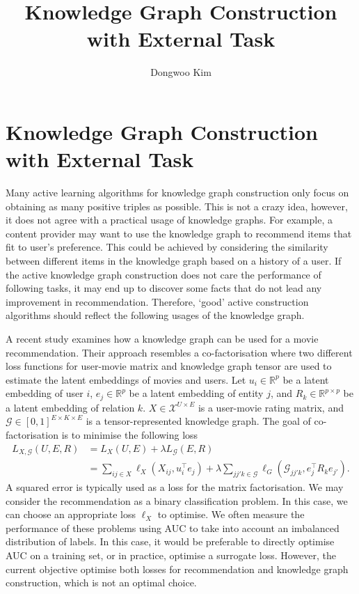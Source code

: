 \documentclass{article} %
\title{Knowledge Graph Construction with External Task }
\author{
Dongwoo Kim
}
\theoremstyle{definition}
\begin{document}
\maketitle


\section{Knowledge Graph Construction with External Task}

Many active learning algorithms for knowledge graph construction only focus on obtaining as many positive triples as possible. This is not a crazy idea, however, it does not agree with a practical usage of knowledge graphs. For example, a content provider may want to use the knowledge graph to recommend items that fit to user's preference. This could be achieved by considering the similarity between different items in the knowledge graph based on a history of a user. If the active knowledge graph construction does not care the performance of following tasks, it may end up to discover some facts that do not lead any improvement in recommendation. Therefore, `good' active construction algorithms should reflect the following usages of the knowledge graph.

A recent study \cite{Zhang2016} examines how a knowledge graph can be used for a movie recommendation. Their approach resembles a co-factorisation where two different loss functions for user-movie matrix and knowledge graph tensor are used to estimate the latent embeddings of movies and users.
Let $u_i \in \mathbb{R}^p$ be a latent embedding of user $i$, $e_j \in \mathbb{R}^p$ be a latent embedding of entity $j$, and $R_k \in \mathbb{R}^{p\times p}$ be a latent embedding of relation $k$. $X \in \mathcal{X}^{U \times E}$ is a user-movie rating matrix, and $\mathcal{G} \in [0,1]^{E\times K\times E}$ is a tensor-represented knowledge graph. The goal of co-factorisation is to minimise the following loss
\begin{align}
L_{X, \mathcal{G}}(U, E, R) & = L_X(U, E) + \lambda L_\mathcal{G}(E, R)\\
& = \sum_{ij \in X}\ell_X(X_{ij}, u_{i}^\top e_{j}) + \lambda \sum_{jj'k \in \mathcal{G}}\ell_G(\mathcal{G}_{jj'k}, e_j^\top R_k e_{j'}).
\end{align}
A squared error is typically used as a loss for the matrix factorisation. We may consider the recommendation as a binary classification problem. In this case, we can choose an appropriate loss $\ell_X$ to optimise.  We often measure the performance of these problems using AUC to take into account an imbalanced distribution of labels. In this case, it would be preferable to directly optimise AUC on a training set, or in practice, optimise a surrogate loss. However, the current objective optimise both losses for recommendation and knowledge graph construction, which is not an optimal choice.
\end{document}
